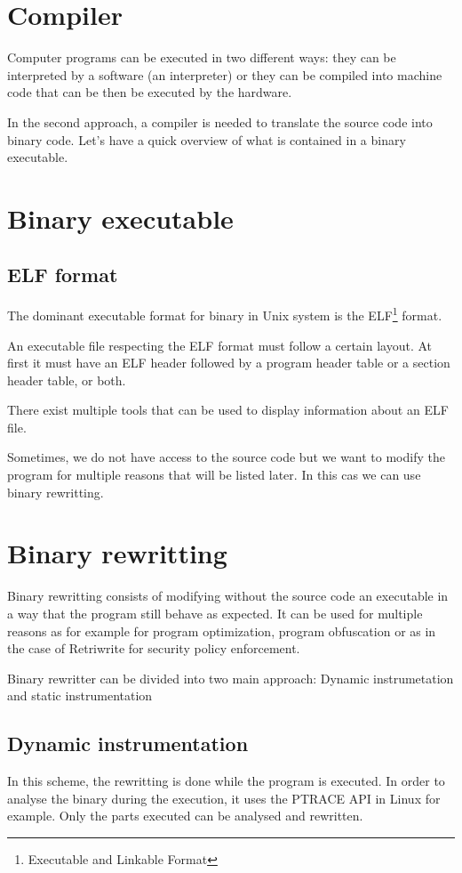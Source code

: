 \documentclass[a4paper,11pt,oneside]{report}
\begin{document}
\section{Compiler}
Computer programs can be executed in two different ways: they can be interpreted
by a software (an interpreter) or they can be compiled into machine code that can
be then be executed by the hardware.

In the second approach, a compiler is needed to translate the source code into binary code.
Let's have a quick overview of what is contained in a binary executable.

\section{Binary executable}
\subsection{ELF format}
The dominant executable format for binary in Unix system is the ELF\footnote{Executable
and Linkable Format} format. 

An executable file respecting the ELF format must follow a certain layout. At
first it must have an ELF header followed by a program header table or a section
header table, or both. 

There exist multiple tools that can be used to display information about an ELF file. 



Sometimes, we do not have access to the source code but we want to modify the program for multiple reasons that will be listed later. In this cas we can use binary rewritting.

\section{Binary rewritting}
Binary rewritting consists of modifying without the source code an executable
in a way that the program still behave as expected. It can be used for multiple
reasons as for example for program optimization, program obfuscation or as in
the case of Retriwrite for security policy enforcement. 

Binary rewritter can be divided into two main approach: Dynamic instrumetation
and static instrumentation

\subsection{Dynamic instrumentation}
In this scheme, the rewritting is done while the program is executed. In order
to analyse the binary during the execution, it uses the PTRACE API in Linux for
example.  Only the parts executed can be analysed and rewritten.
\end{document}
